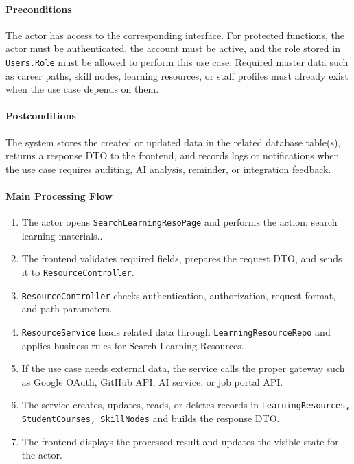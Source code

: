 \paragraph{Preconditions}

The actor has access to the corresponding interface. For protected functions, the actor must be authenticated, the account must be active, and the role stored in \texttt{Users.Role} must be allowed to perform this use case. Required master data such as career paths, skill nodes, learning resources, or staff profiles must already exist when the use case depends on them.

\paragraph{Postconditions}

The system stores the created or updated data in the related database table(s), returns a response DTO to the frontend, and records logs or notifications when the use case requires auditing, AI analysis, reminder, or integration feedback.

\paragraph{Main Processing Flow}

\begin{enumerate}
    \item The actor opens \texttt{SearchLearningResoPage} and performs the action: search learning materials..
    \item The frontend validates required fields, prepares the request DTO, and sends it to \texttt{ResourceController}.
    \item \texttt{ResourceController} checks authentication, authorization, request format, and path parameters.
    \item \texttt{ResourceService} loads related data through \texttt{LearningResourceRepo} and applies business rules for Search Learning Resources.
    \item If the use case needs external data, the service calls the proper gateway such as Google OAuth, GitHub API, AI service, or job portal API.
    \item The service creates, updates, reads, or deletes records in \texttt{LearningResources, StudentCourses, SkillNodes} and builds the response DTO.
    \item The frontend displays the processed result and updates the visible state for the actor.
\end{enumerate}

